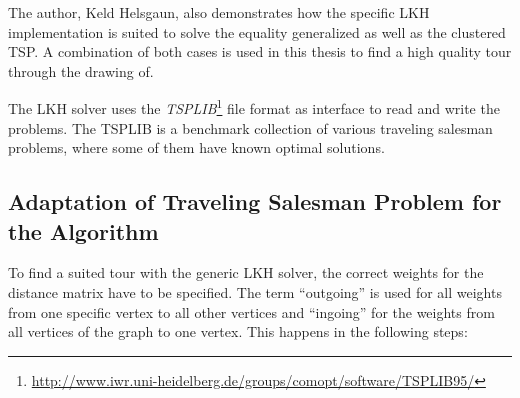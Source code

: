 The author, Keld Helsgaun, also demonstrates how the specific LKH implementation is suited to solve the equality generalized\citep{helsgaun2013equality} as well as the clustered TSP\cite{helsgaun2014solving}. A combination of both cases is used in this thesis to find a high quality tour through the drawing of.

The LKH solver uses the \textit{TSPLIB}\footnote{\url{http://www.iwr.uni-heidelberg.de/groups/comopt/software/TSPLIB95/}} file format as interface to read and write the problems. The TSPLIB is a benchmark collection of various traveling salesman problems, where some of them have known optimal solutions.

\subsection{Adaptation of Traveling Salesman Problem for the Algorithm}

To find a suited tour with the generic LKH solver, the correct weights for the distance matrix have to be specified. The term \enquote{outgoing} is used for all weights from one specific vertex to all other vertices and \enquote{ingoing} for the weights from all vertices of the graph to one vertex. This happens in the following steps:

